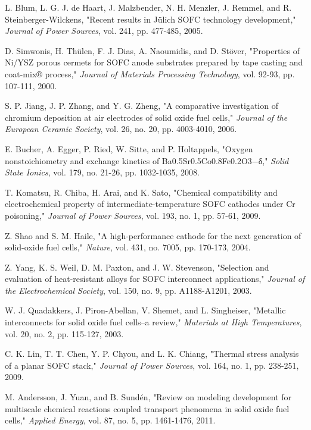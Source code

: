 \documentclass[conference]{IEEEtran}
\begin{document}
\begin{thebibliography}{99}
L. Blum, L. G. J. de Haart, J. Malzbender, N. H. Menzler, J. Remmel, and R. Steinberger-Wilckens, "Recent results in Jülich SOFC technology development," \textit{Journal of Power Sources}, vol. 241, pp. 477-485, 2005.

D. Simwonis, H. Thülen, F. J. Dias, A. Naoumidis, and D. Stöver, "Properties of Ni/YSZ porous cermets for SOFC anode substrates prepared by tape casting and coat-mix® process," \textit{Journal of Materials Processing Technology}, vol. 92-93, pp. 107-111, 2000.

S. P. Jiang, J. P. Zhang, and Y. G. Zheng, "A comparative investigation of chromium deposition at air electrodes of solid oxide fuel cells," \textit{Journal of the European Ceramic Society}, vol. 26, no. 20, pp. 4003-4010, 2006.

E. Bucher, A. Egger, P. Ried, W. Sitte, and P. Holtappels, "Oxygen nonstoichiometry and exchange kinetics of Ba0.5Sr0.5Co0.8Fe0.2O3−δ," \textit{Solid State Ionics}, vol. 179, no. 21-26, pp. 1032-1035, 2008.

T. Komatsu, R. Chiba, H. Arai, and K. Sato, "Chemical compatibility and electrochemical property of intermediate-temperature SOFC cathodes under Cr poisoning," \textit{Journal of Power Sources}, vol. 193, no. 1, pp. 57-61, 2009.

Z. Shao and S. M. Haile, "A high-performance cathode for the next generation of solid-oxide fuel cells," \textit{Nature}, vol. 431, no. 7005, pp. 170-173, 2004.

Z. Yang, K. S. Weil, D. M. Paxton, and J. W. Stevenson, "Selection and evaluation of heat-resistant alloys for SOFC interconnect applications," \textit{Journal of the Electrochemical Society}, vol. 150, no. 9, pp. A1188-A1201, 2003.

W. J. Quadakkers, J. Piron-Abellan, V. Shemet, and L. Singheiser, "Metallic interconnects for solid oxide fuel cells–a review," \textit{Materials at High Temperatures}, vol. 20, no. 2, pp. 115-127, 2003.

C. K. Lin, T. T. Chen, Y. P. Chyou, and L. K. Chiang, "Thermal stress analysis of a planar SOFC stack," \textit{Journal of Power Sources}, vol. 164, no. 1, pp. 238-251, 2009.

M. Andersson, J. Yuan, and B. Sundén, "Review on modeling development for multiscale chemical reactions coupled transport phenomena in solid oxide fuel cells," \textit{Applied Energy}, vol. 87, no. 5, pp. 1461-1476, 2011.


\end{thebibliography}
\end{document}
